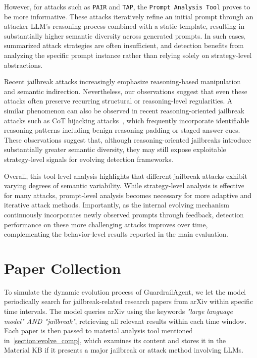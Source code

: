 \documentclass[letterpaper,twocolumn,10pt]{article}
\newcommand{\agentname}{GuardrailAgent\xspace}
\begin{document}
However, for attacks such as \texttt{PAIR} and \texttt{TAP}, the \texttt{Prompt Analysis Tool} proves to be more informative.
These attacks iteratively refine an initial prompt through an attacker LLM’s reasoning process combined with a static template, resulting in substantially higher semantic diversity across generated prompts.
In such cases, summarized attack strategies are often insufficient, and detection benefits from analyzing the specific prompt instance rather than relying solely on strategy-level abstractions.

Recent jailbreak attacks increasingly emphasize reasoning-based manipulation and semantic indirection.
Nevertheless, our observations suggest that even these attacks often preserve recurring structural or reasoning-level regularities.
A similar phenomenon can also be observed in recent reasoning-oriented jailbreak attacks such as CoT hijacking attacks~\cite{ZFSSB26}, which frequently incorporate identifiable reasoning patterns including benign reasoning padding or staged answer cues.
These observations suggest that, although reasoning-oriented jailbreaks introduce substantially greater semantic diversity, they may still expose exploitable strategy-level signals for evolving detection frameworks.

Overall, this tool-level analysis highlights that different jailbreak attacks exhibit varying degrees of semantic variability.
While strategy-level analysis is effective for many attacks, prompt-level analysis becomes necessary for more adaptive and iterative attack methods.
Importantly, as the internal evolving mechanism continuously incorporates newly observed prompts through feedback, detection performance on these more challenging attacks improves over time, complementing the behavior-level results reported in the main evaluation.

\section{Paper Collection}
\label{appendix:paper-collection}

To simulate the dynamic evolution process of \agentname, we let the model periodically search for jailbreak-related research papers from arXiv within specific time intervals.
The model queries arXiv using the keywords \emph{"large language model" AND "jailbreak"}, retrieving all relevant results within each time window.
Each paper is then passed to material analysis tool mentioned in~\autoref{section:evolve_comp}, which examines its content and stores it in the Material KB if it presents a major jailbreak or attack method involving LLMs.
\end{document}
